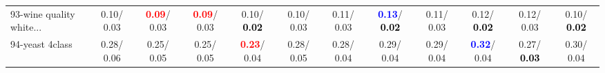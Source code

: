 \begin{table}[h]
\begin{center}
{\begin{tabular}{lc|c|c|c|c|c|c|c|c|c|c}
93-wine quality white... &   0.10/  0.03 & \textcolor{red}{\textbf{  0.09}}/  0.03 & \textcolor{red}{\textbf{  0.09}}/  0.03 &   0.10/\textcolor{black}{\textbf{  0.02}} &   0.10/  0.03 &   0.11/  0.03 & \textcolor{blue}{\textbf{  0.13}}/\textcolor{black}{\textbf{  0.02}} &   0.11/  0.03 &   0.12/\textcolor{black}{\textbf{  0.02}} &   0.12/  0.03 &   0.10/\textcolor{black}{\textbf{  0.02}} \\
94-yeast 4class &   0.28/  0.06 &   0.25/  0.05 &   0.25/  0.05 & \textcolor{red}{\textbf{  0.23}}/  0.04 &   0.28/  0.05 &   0.28/  0.04 &   0.29/  0.04 &   0.29/  0.04 & \textcolor{blue}{\textbf{  0.32}}/  0.04 &   0.27/\textcolor{black}{\textbf{  0.03}} &   0.30/  0.04 \\\end{tabular}
}\label{strats2b5NN}
\end{center}
\end{table}